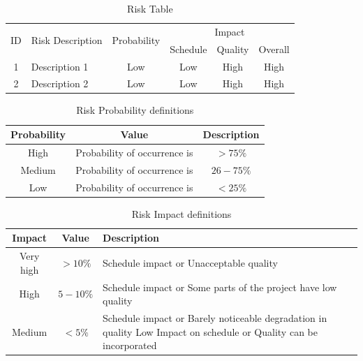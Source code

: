 \documentclass[oneside,a4paper,12pt]{report}
\begin{document}
\begin{table}[!htbp]
\begin{center}
\def\arraystretch{1.5}
\begin{tabularx}{\textwidth}{| c | X | c | c | c | c |}
\hline
\multirow{2}{*}{ID} & \multirow{2}{*}{Risk Description}	& \multirow{2}{*}{Probability} & \multicolumn{3}{|c|}{Impact} \\ \cline{4-6}
	& & &	Schedule	& Quality	& Overall \\ \hline
1	& Description 1	& Low	& Low	& High	& High \\ \hline
2	& Description 2	& Low	& Low	& High	& High \\ \hline
\end{tabularx}
\end{center}
\caption{Risk Table}
\label{tab:risk}
\end{table}


\begin{table}[!htbp]
\begin{center}
\def\arraystretch{1.5}
\begin{tabular}{| c | c | c |}
\hline
Probability & Value &	Description \\ \hline
High &	Probability of occurrence is &  $ > 75 \% $ \\ \hline
Medium &	Probability of occurrence is  & $26-75 \% $ \\ \hline
Low	& Probability of occurrence is & $ < 25 \% $ \\ \hline
\end{tabular}
\end{center}
\caption{Risk Probability definitions \cite{bookPressman}}
\label{tab:riskdef}
\end{table}

\begin{table}[!htbp]
\begin{center}
\def\arraystretch{1.5}
\begin{tabularx}{\textwidth}{| c | c | X |}
\hline
Impact & Value	& Description \\ \hline
Very high &	$> 10 \%$ & Schedule impact or Unacceptable quality \\ \hline
High &	$5-10 \%$ & Schedule impact or Some parts of the project have low quality \\ \hline
Medium	& $ < 5 \% $ & Schedule impact or Barely noticeable degradation in quality Low	Impact on schedule or Quality can be incorporated \\ \hline
\end{tabularx}
\end{center}
\caption{Risk Impact definitions \cite{bookPressman}}
\label{tab:riskImpactDef}
\end{table}
\end{document}
